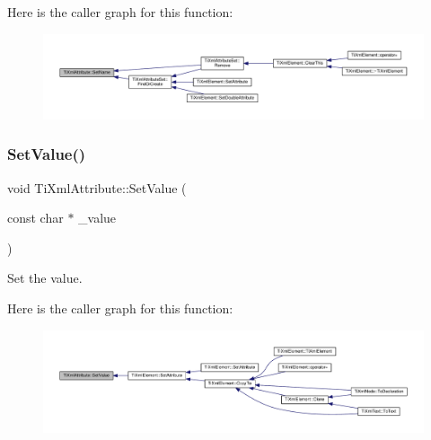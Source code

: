 Here is the caller graph for this function\+:\nopagebreak
\begin{figure}[H]
\begin{center}
\leavevmode
\includegraphics[width=350pt]{class_ti_xml_attribute_ab7fa3d21ff8d7c5764cf9af15b667a99_icgraph}
\end{center}
\end{figure}
\mbox{\label{class_ti_xml_attribute_a2dae44178f668b3cb48101be4f2236a0}} 
\subsubsection{\texorpdfstring{Set\+Value()}{SetValue()}}
{\footnotesize\ttfamily void Ti\+Xml\+Attribute\+::\+Set\+Value (\begin{DoxyParamCaption}\item[{const char $\ast$}]{\+\_\+value }\end{DoxyParamCaption})\hspace{0.3cm}{\ttfamily [inline]}}



Set the value. 

Here is the caller graph for this function\+:\nopagebreak
\begin{figure}[H]
\begin{center}
\leavevmode
\includegraphics[width=350pt]{class_ti_xml_attribute_a2dae44178f668b3cb48101be4f2236a0_icgraph}
\end{center}
\end{figure}
\mbox{\label{class_ti_xml_attribute_ac9f0b56fcacbedb6eb49e5f282bef014}} 
